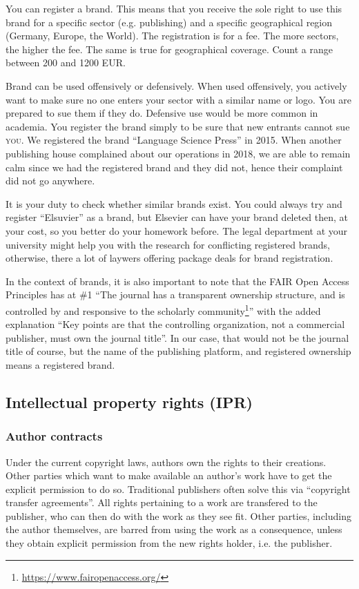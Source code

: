 \documentclass[guidelines,nonflat,modfonts] {langsci/langscibook}
\newcommand{\footurl}[1]{\footnote{\url{#1}}}
\begin{document}
You can register a brand. This means that you receive the sole right to use this brand for a specific sector (e.g. publishing) and a specific geographical region (Germany, Europe, the World). The registration is for a fee. The more sectors, the higher the fee. The same is true for geographical coverage. Count a range between 200 and 1200 EUR. 

Brand can be used offensively or defensively. When used offensively, you actively want to make sure no one enters your sector with a similar name or logo. You are prepared to sue them if they do. Defensive use would be more common in academia. You register the brand simply to be sure that new entrants cannot sue \textsc{you}. We registered the brand ``Language Science Press'' in 2015. When another publishing house complained about our operations in 2018, we are able to remain calm since we had the registered brand and they did not, hence their complaint did not go anywhere.

It is your duty to check whether similar brands exist. You could always try and register ``Elsuvier'' as a brand, but Elsevier can have your brand deleted then, at your cost, so you better do your homework before. The legal department at your university might help you with the research for conflicting registered brands, otherwise, there a lot of laywers offering package deals for brand registration. 

In the context of brands, it is also important to note that the FAIR Open Access Principles has at \#1 ``The journal has a transparent ownership structure, and is controlled by and responsive to the scholarly community\footurl{https://www.fairopenaccess.org/}'' with the added explanation 
``Key points are that the controlling organization, not a commercial publisher, must own the journal title''. In our case, that would not be the journal title of course, but the name of the publishing platform, and registered ownership means a registered brand. 
 
\subsection{Intellectual property rights (IPR)}
\subsubsection{Author contracts}
Under the current copyright laws, authors own the rights to their creations. Other parties which want to make available an author's work have to get the explicit permission to do so. Traditional publishers often solve this via ``copyright transfer agreements''. All rights pertaining to a work are transfered to the publisher, who can then do with the work as they see fit. Other parties, including the author themselves, are barred from using the work as a consequence, unless they obtain explicit permission from the new rights holder, i.e. the publisher. 
\end{document}
